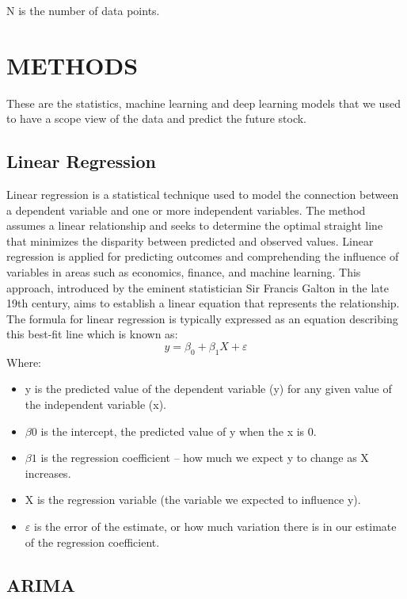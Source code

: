 \documentclass{ieeeojies}
\begin{document}
N is the number of data points.


\section{METHODS}
\hspace{0.3cm} These are the statistics, machine learning and deep learning models that we used to have a scope view of the data and predict the future stock.

\subsection{Linear Regression}
\hspace{0.3cm} Linear regression is a statistical technique used to model the connection between a dependent variable and one or more independent variables. The method assumes a linear relationship and seeks to determine the optimal straight line that minimizes the disparity between predicted and observed values. Linear regression is applied for predicting outcomes and comprehending the influence of variables in areas such as economics, finance, and machine learning. This approach, introduced by the eminent statistician Sir Francis Galton in the late 19th century, aims to establish a linear equation that represents the relationship. The formula for linear regression is typically expressed as an equation describing this best-fit line which is known as:
$$y = \beta_0 + \beta_1X + \varepsilon$$
Where:
\begin{itemize}
    \item y is the predicted value of the dependent variable (y) for any given value of the independent variable (x).
    \item $\beta0$ is the intercept, the predicted value of y when the x is 0.
    \item $\beta1$ is the regression coefficient – how much we expect y to change as X increases.
    \item X is the regression variable (the variable we expected to influence y).
    \item $\varepsilon$ is the error of the estimate, or how much variation there is in our estimate of the regression coefficient.
\end{itemize}

\subsection{ARIMA}
\end{document}

